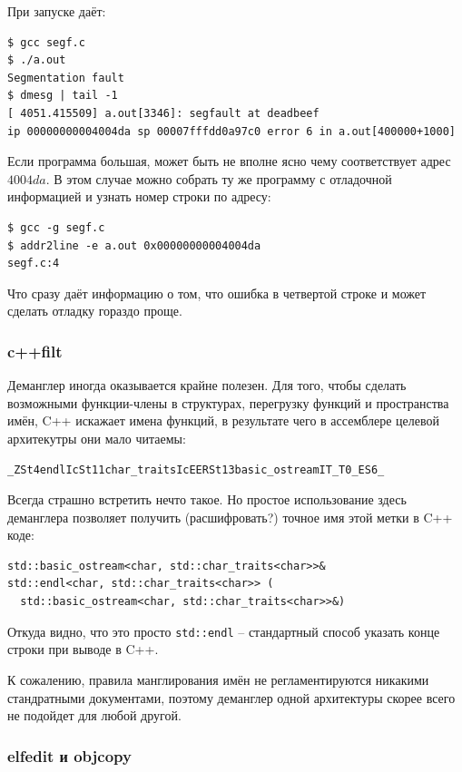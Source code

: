 \documentclass[a4paper,12pt,oneside]{article}
\begin{document}
При запуске даёт:

\begin{verbatim}
$ gcc segf.c
$ ./a.out 
Segmentation fault
$ dmesg | tail -1
[ 4051.415509] a.out[3346]: segfault at deadbeef 
ip 00000000004004da sp 00007fffdd0a97c0 error 6 in a.out[400000+1000]
\end{verbatim}

Если программа большая, может быть не вполне ясно чему соответствует адрес $4004da$. В этом случае можно собрать ту же программу с отладочной информацией и узнать номер строки по адресу:

\begin{verbatim}
$ gcc -g segf.c
$ addr2line -e a.out 0x00000000004004da
segf.c:4
\end{verbatim}

Что сразу даёт информацию о том, что ошибка в четвертой строке и может сделать отладку гораздо проще.

\subsubsection{c++filt}\label{subsubsec:Demangle}

Деманглер иногда оказывается крайне полезен. Для того, чтобы сделать возможными функции-члены в структурах, перегрузку функций и пространства имён, C++ искажает имена функций, в результате чего в ассемблере целевой архитекутры они мало читаемы:

\begin{verbatim}
_ZSt4endlIcSt11char_traitsIcEERSt13basic_ostreamIT_T0_ES6_
\end{verbatim}

Всегда страшно встретить нечто такое. Но простое использование здесь деманглера позволяет получить (расшифровать?) точное имя этой метки в C++ коде:

\begin{lstlisting}
std::basic_ostream<char, std::char_traits<char>>& 
std::endl<char, std::char_traits<char>> (
  std::basic_ostream<char, std::char_traits<char>>&)
\end{lstlisting}

Откуда видно, что это просто \lstinline!std::endl! -- стандартный способ указать конце строки при выводе в C++.

К сожалению, правила манглирования имён не регламентируются никакими стандратными документами, поэтому деманглер одной архитектуры скорее всего не подойдет для любой другой.

\subsubsection{elfedit и objcopy}\label{subsubsec:Objcopy}
\end{document}
